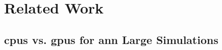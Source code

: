 \documentclass[11pt,a4paper]{article}
\begin{document}
\section{Related Work}














\subsection{\glspl{cpu} vs. \glspl{gpu} for \gls{ann} Large Simulations}

\end{document}
